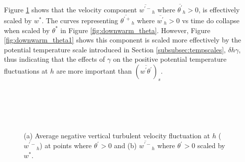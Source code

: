 Figure \ref{fig:downwarm_wvel} shows that the velocity component $\overline{w^{'-}}_{h}$  where $ \overline{\theta^{'}}_{h}>0$, is effectively scaled by $w^{*}$.  The curves representing $\overline{\theta^{'+}}_{h}$ where $\overline{w^{'}}_{h}>0$ vs time do collapse when scaled by $\theta^{*}$ in Figure \ref{fig:downwarm_theta}.  However, Figure \ref{fig:downwarm_theta1} shows this component is scaled more effectively by the potential temperature scale introduced in Section \ref{subsubsec:tempscales}, $\delta h \gamma$, thus indicating that the effects of $\gamma$ on the positive potential temperature fluctuations at $h$ are more important than $(\overline{w^{'}\theta^{'}})_{s}$.\\ 
\\   

\begin{figure}[htbp]
\begin{minipage}[b]{0.5\linewidth}
        \\
        \end{minipage}             
\quad
\begin{minipage}[b]{0.5\linewidth}
        \\       
       \end{minipage}
        \caption[Downward turbulent velocity Fluctuations at $h$]{(a) Average negative vertical turbulent velocity fluctuation at $h$ ($\overline{w^{\prime-}}_{h}$) at points where $\theta^{\prime}>0$ and (b) $\overline{w^{\prime-}}_{h}$ where $\theta^{\prime}>0$ scaled by $w^{*}$.}
        \label{fig:downwarm_wvel}
\end{figure}

